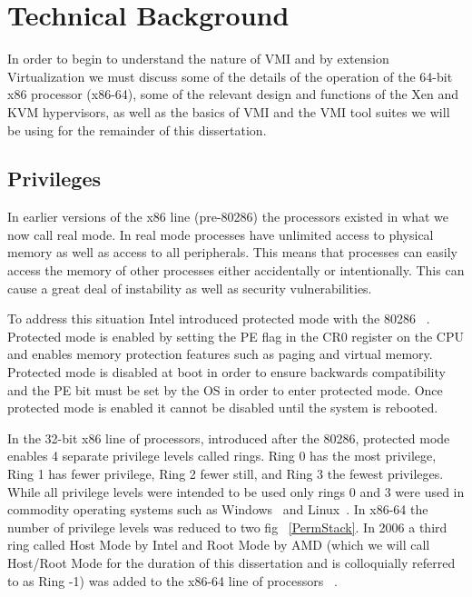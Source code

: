 \section{Technical Background}
In order to begin to understand the nature of VMI and by extension Virtualization we must discuss some of the details of the operation of the 64-bit x86 processor (x86-64), some of the relevant design and functions of the Xen and KVM hypervisors, as well as the basics of VMI and the VMI tool suites we will be using for the remainder of this dissertation. 




\subsection{Privileges}

In earlier versions of the x86 line (pre-80286) the processors existed in what we now call real mode. In real mode processes have unlimited access to physical memory as well as access to all peripherals. This means that processes can easily access the memory of other processes either accidentally or intentionally. This can cause a great deal of instability as well as security vulnerabilities. 

To address this situation Intel introduced protected mode with the 80286 ~\cite{_iapx_1983}. Protected mode is enabled by setting the PE flag in the CR0 register on the CPU and enables memory protection features such as paging and virtual memory. Protected mode is disabled at boot in order to ensure backwards compatibility and the PE bit must be set by the OS in order to enter protected mode. Once protected mode is enabled it cannot be disabled until the system is rebooted. 


In the 32-bit x86 line of processors, introduced after the 80286, protected mode enables 4 separate privilege levels called rings. Ring 0 has the most privilege, Ring 1 has fewer privilege, Ring 2 fewer still, and Ring 3 the fewest privileges. While all privilege levels were intended to be used only rings 0 and 3 were used in commodity operating systems such as Windows~\cite{_microsoft_2014} and Linux~\cite{_Linux_archive}. In x86-64 the number of privilege levels was reduced to two fig ~\ref{PermStack}. In 2006 a third ring called Host Mode by Intel and Root Mode by AMD (which we will call Host/Root Mode for the duration of this dissertation and is colloquially referred to as Ring -1) was added to the x86-64 line of processors ~\cite{codenamed_pacifica_2005}. 



